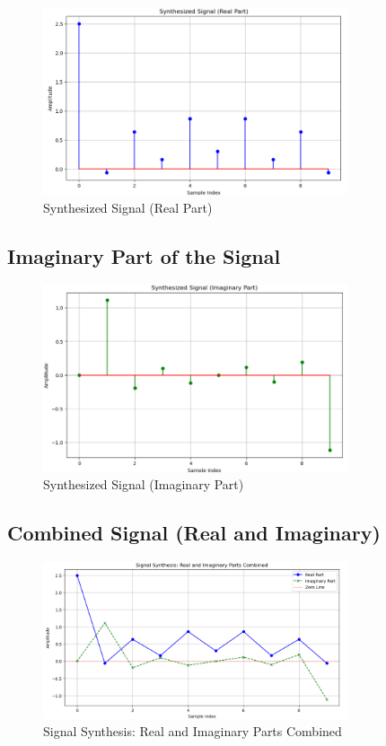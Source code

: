 \documentclass[12pt]{article}
\begin{document}
\begin{figure}[htbp]
    \centering
    \includegraphics[width=0.8\textwidth]{1.png}
    \caption{Synthesized Signal (Real Part)}
    \label{fig:real_part}

\end{figure}
\newpage
\vfill
\subsection{Imaginary Part of the Signal}
\begin{figure}[htbp]
    \centering
    \includegraphics[width=0.8\textwidth]{2.png}
    \caption{Synthesized Signal (Imaginary Part)}
    \label{fig:imaginary_part}
\end{figure}

\FloatBarrier
\vfill
\newpage
\subsection{Combined Signal (Real and Imaginary)}
\begin{figure}[htbp]
    \centering
    \includegraphics[width=0.8\textwidth]{3.png}
    \caption{Signal Synthesis: Real and Imaginary Parts Combined}
    \label{fig:combined_signal}
\end{figure}
\end{document}
